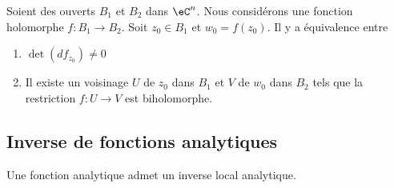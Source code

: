 \begin{theorem}       \label{THOooNBGZooHuGtxW}
	Soient des ouverts \( B_1\) et \( B_2\) dans \( \eC^n\). Nous considérons une fonction holomorphe \( f\colon B_1\to B_2\). Soit \( z_0\in B_1\) et \( w_0=f(z_0)\). Il y a équivalence entre
	\begin{enumerate}
		\item
		      \( \det(df_{z_0})\neq 0\)
		\item
		      Il existe un voisinage \( U\) de \( z_0\) dans \( B_1\) et \( V\) de \( w_0\) dans \( B_2\) tels que la restriction \( f\colon U\to V\) est biholomorphe.
	\end{enumerate}
\end{theorem}

\subsection{Inverse de fonctions analytiques}

\begin{theorem}     \label{THOooXWCSooLSPzhO}
	Une fonction analytique admet un inverse local analytique.
\end{theorem}
